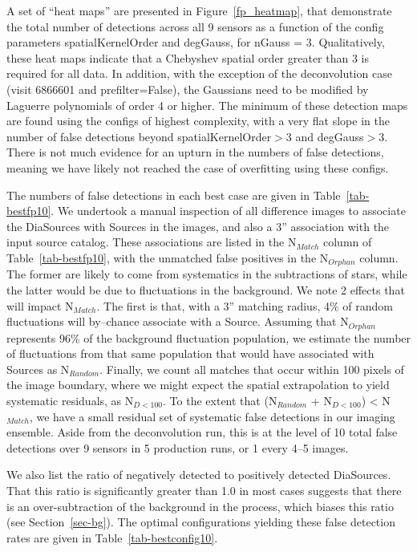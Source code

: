 \documentclass[prd, nofootinbib, floatfix, 11pt,tightenlines,times]{article}
\begin{document}
A set of ``heat maps'' are presented in Figure~\ref{fp_heatmap}, that
demonstrate the total number of detections across all 9 sensors as a
function of the config parameters spatialKernelOrder and degGauss, for
nGauss = 3.  Qualitatively, these heat maps indicate that a Chebyshev
spatial order greater than 3 is required for all data.  In addition,
with the exception of the deconvolution case (visit 6866601 and
prefilter=False), the Gaussians need to be modified by Laguerre
polynomials of order 4 or higher.  The minimum of these detection maps
are found using the configs of highest complexity, with a very flat
slope in the number of false detections beyond spatialKernelOrder$>$3
and degGauss$>$3.  There is not much evidence for an upturn in the
numbers of false detections, meaning we have likely not reached the
case of overfitting using these configs.

The numbers of false detections in each best case are given in
Table~\ref{tab-bestfp10}.  We undertook a manual inspection of all
difference images to associate the DiaSources with Sources in the
images, and also a 3'' association with the input source catalog.
These associations are listed in the N$_{Match}$ column of
Table~\ref{tab-bestfp10}, with the unmatched false positives in the
N$_{Orphan}$ column.  The former are likely to come from systematics
in the subtractions of stars, while the latter would be due to
fluctuations in the background.  We note 2 effects that will impact
N$_{Match}$.  The first is that, with a 3'' matching radius, 4\% of
random fluctuations will by--chance associate with a Source.  Assuming
that N$_{Orphan}$ represents 96\% of the background fluctuation
population, we estimate the number of fluctuations from that same
population that would have associated with Sources as N$_{Random}$.
Finally, we count all matches that occur within 100 pixels of the
image boundary, where we might expect the spatial extrapolation to
yield systematic residuals, as N$_{D<100}$.  To the extent that
(N$_{Random}$ + N$_{D<100}$) < N$_{Match}$, we have a small residual
set of systematic false detections in our imaging ensemble.  Aside
from the deconvolution run, this is at the level of 10 total false
detections over 9 sensors in 5 production runs, or 1 every 4--5
images.

We also list the ratio of negatively detected to positively detected
DiaSources.  That this ratio is significantly greater than 1.0 in most
cases suggests that there is an over-subtraction of the background in
the process, which biases this ratio (see Section~\ref{sec-bg}).  The
optimal configurations yielding these false detection rates are given
in Table~\ref{tab-bestconfig10}.
\end{document}
